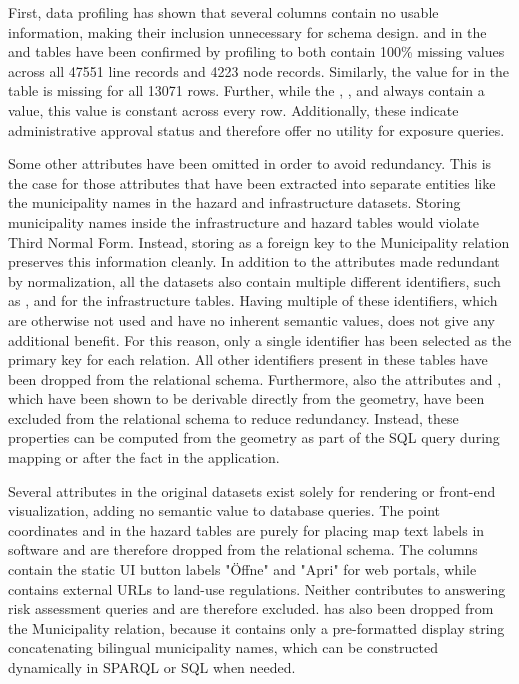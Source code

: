 First, data profiling has shown that several columns contain no usable information, making their inclusion unnecessary for schema design.  and   in the  and  tables have been confirmed by profiling to both contain 100\% missing values across all 47551 line records and 4223 node records.
Similarly, the value for  in the  table is missing for all 13071 rows.
Further, while the , , and  always contain a value, this value is constant across every row. Additionally, these indicate administrative approval status and therefore offer no utility for exposure queries.

Some other attributes have been omitted in order to avoid redundancy.
This is the case for those attributes that have been extracted into separate entities like the municipality names in the hazard and infrastructure datasets. Storing municipality names inside the infrastructure and hazard tables would violate Third Normal Form. Instead, storing  as a foreign key to the Municipality relation preserves this information cleanly.
In addition to the attributes made redundant by normalization, all the datasets also contain multiple different identifiers, such as ,  and  for the infrastructure tables. Having multiple of these identifiers, which are otherwise not used and have no inherent semantic values, does not give any additional benefit. For this reason, only a single identifier has been selected as the primary key for each relation. All other identifiers present in these tables have been dropped from the relational schema.
Furthermore, also the attributes  and , which have been shown to be derivable directly from the geometry, have been excluded from the relational schema to reduce redundancy. Instead, these properties can be computed from the geometry as part of the SQL query during mapping or after the fact in the application.

Several attributes in the original datasets exist solely for rendering or front-end visualization, adding no semantic value to database queries.
The point coordinates  and  in the hazard tables are purely for placing map text labels in software and are therefore dropped from the relational schema.
The  columns contain the static UI button labels "Öffne" and "Apri" for web portals, while  contains external URLs to land-use regulations. Neither contributes to answering risk assessment queries and are therefore excluded.
 has also been dropped from the Municipality relation, because it contains only a pre-formatted display string concatenating bilingual municipality names, which can be constructed dynamically in SPARQL or SQL when needed.

